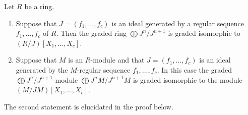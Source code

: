 \begin{lemma}
\label{lemma-regular-quasi-regular}
Let $R$ be a ring.
\begin{enumerate}
\item Suppose that $J = (f_1, \ldots, f_c)$ is an ideal generated
by a regular sequence $f_1, \ldots, f_c$ of $R$. Then the graded
ring $\bigoplus J^n/J^{n + 1}$ is graded isomorphic to
$(R/J)[X_1, \ldots, X_c]$.
\item Suppose that $M$ is an $R$-module and that $J = (f_1, \ldots, f_c)$
is an ideal generated by the $M$-regular sequence
$f_1, \ldots, f_c$. In this case the graded
$\bigoplus J^n/J^{n + 1}$-module $\bigoplus J^nM/J^{n + 1}M$
is graded isomorphic to the module $(M/JM)[X_1, \ldots, X_c]$.
\end{enumerate}
The second statement is elucidated in the proof below.
\end{lemma}

